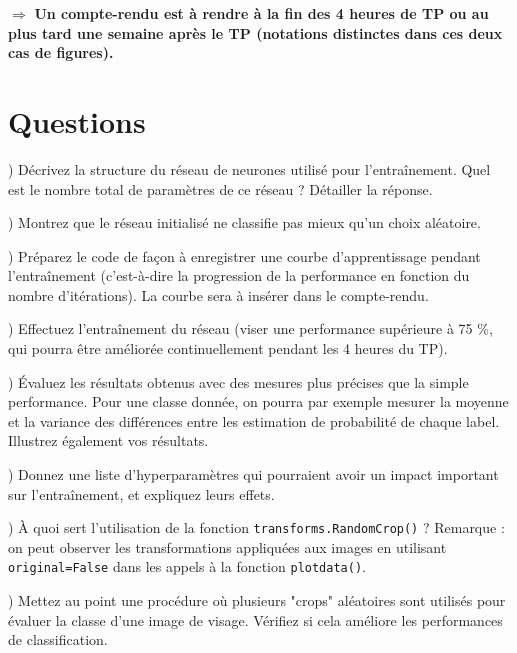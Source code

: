 \documentclass[a4paper,11pt]{article}
\begin{document}
$\Rightarrow$ \textbf{Un compte-rendu est à rendre à la fin des 4 heures de TP ou au plus tard une semaine après le TP (notations distinctes dans ces deux cas de figures).}

\section{Questions}

) Décrivez la structure du réseau de neurones utilisé pour l'entraînement. Quel est le nombre total de paramètres de ce réseau ? Détailler la réponse. 
\newline

) Montrez que le réseau initialisé ne classifie pas mieux qu'un choix aléatoire.
\newline

) Préparez le code de façon à enregistrer une courbe d'apprentissage pendant l'entraînement (c'est-à-dire la progression de la performance en fonction du nombre d'itérations). La courbe sera à insérer dans le compte-rendu.
\newline

) Effectuez l'entraînement du réseau (viser une performance supérieure à 75 \%, qui pourra être améliorée continuellement pendant les 4 heures du TP).
\newline

) Évaluez les résultats obtenus avec des mesures 
plus précises que la simple performance. Pour une classe donnée, on pourra par exemple
mesurer la moyenne et la variance des différences entre les estimation de probabilité de chaque label. Illustrez également vos résultats.
\newline

) Donnez une liste d'hyperparamètres qui pourraient avoir un impact important sur l'entraînement, et expliquez leurs effets.
\newline

) À quoi sert l'utilisation de la fonction \texttt{transforms.RandomCrop()} ?
Remarque : on peut observer les transformations appliquées aux images en utilisant \texttt{original=False} dans les appels à la fonction \texttt{plotdata()}.
\newline

) Mettez au point une procédure où plusieurs "crops" aléatoires sont utilisés pour évaluer la classe d'une image de visage. Vérifiez si cela améliore les performances de classification.
\newline
\end{document}
